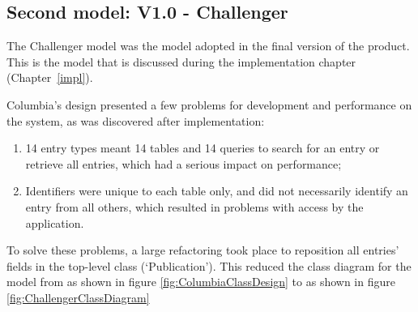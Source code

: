 \subsection{Second model: V1.0 - Challenger}
\label{designChallenger}
The Challenger model was the model adopted in the final version of the product.  This is the model that is discussed during the implementation chapter (Chapter~\ref{impl}).

Columbia's design presented a few problems for development and performance on the system, as was discovered after implementation:
\begin{enumerate}
	\item 14 entry types meant 14 tables and 14 queries to search for an entry or retrieve all entries, which had a serious impact on performance;
	\item Identifiers were unique to each table only, and did not necessarily identify an entry from all others, which resulted in problems with access by the application.
\end{enumerate}

To solve these problems, a large refactoring took place to reposition all entries' fields in the top-level class (`Publication').  This reduced the class diagram for the model from as shown in figure \ref{fig:ColumbiaClassDesign} to as shown in figure \ref{fig:ChallengerClassDiagram}

